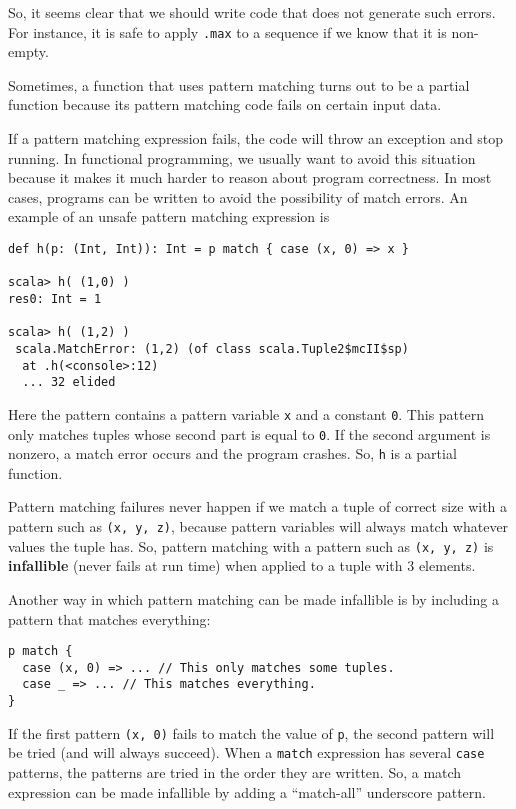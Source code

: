 So, it seems clear that we should write code that does not generate
such errors. For instance, it is safe to apply \lstinline!.max!
to a sequence if we know that it is non-empty.

Sometimes, a function that uses pattern matching turns out to be a
partial function because its pattern matching code fails on certain
input data. 

If a pattern matching expression fails, the code will throw an exception
and stop running. In functional programming, we usually want to avoid
this situation because it makes it much harder to reason about program
correctness. In most cases, programs can be written to avoid the possibility
of match errors. An example of an unsafe pattern matching expression
is
\begin{lstlisting}[mathescape=false]
def h(p: (Int, Int)): Int = p match { case (x, 0) => x }

scala> h( (1,0) )
res0: Int = 1

scala> h( (1,2) )
 scala.MatchError: (1,2) (of class scala.Tuple2$mcII$sp)
  at .h(<console>:12)
  ... 32 elided 
\end{lstlisting}
Here the pattern contains a pattern variable \lstinline!x!
and a constant \lstinline!0!.
This pattern only matches tuples whose second part is equal to \lstinline!0!.
If the second argument is nonzero, a match error occurs and the program
crashes. So, \lstinline!h!
is a partial function.

Pattern matching failures never happen if we match a tuple of correct
size with a pattern such as \lstinline!(x, y, z)!,
because pattern variables will always match whatever values the tuple
has. So, pattern matching with a pattern such as \lstinline!(x, y, z)!
is \textbf{infallible} (never
fails at run time) when applied to a tuple with $3$ elements.

Another way in which pattern matching can be made infallible is by
including a pattern that matches everything:
\begin{lstlisting}
p match {
  case (x, 0) => ... // This only matches some tuples.
  case _ => ... // This matches everything.
}
\end{lstlisting}
If the first pattern \lstinline!(x, 0)!
fails to match the value of \lstinline!p!,
the second pattern will be tried (and will always succeed). When a
\lstinline!match! expression
has several \lstinline!case!
patterns, the patterns are tried in the order they are written. So,
a match expression can be made infallible by adding a ``match-all''
underscore pattern.

